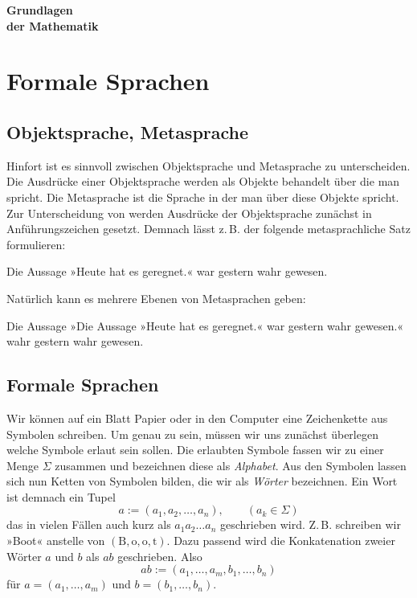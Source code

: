 \documentclass[a4paper,11pt,fleqn,twocolumn,twoside]{article}
\numberwithin{equation}{section}
\begin{document}
\thispagestyle{empty}

\begin{huge}
\noindent
\textbf{Grundlagen\\
der Mathematik}
\par
\end{huge}

\tableofcontents

\section{Formale Sprachen}
\subsection{Objektsprache, Metasprache}
Hinfort ist es sinnvoll zwischen Objektsprache und Metasprache
zu unterscheiden. Die Ausdrücke einer Objektsprache werden als
Objekte behandelt über die man spricht. Die Metasprache ist die
Sprache in der man über diese Objekte spricht. Zur Unterscheidung
von werden Ausdrücke der Objektsprache zunächst in Anführungszeichen
gesetzt. Demnach lässt z.\,B. der folgende metasprachliche
Satz formulieren:

Die Aussage »Heute hat es geregnet.« war gestern wahr gewesen.

Natürlich kann es mehrere Ebenen von Metasprachen geben:

Die Aussage »Die Aussage »Heute hat es geregnet.« war gestern wahr
gewesen.« wahr gestern wahr gewesen.

\subsection{Formale Sprachen}

Wir können auf ein Blatt Papier oder in den Computer eine Zeichenkette
aus Symbolen schreiben. Um genau zu sein, müssen wir uns zunächst
überlegen welche Symbole erlaut sein sollen. Die erlaubten Symbole
fassen wir zu einer Menge $\Sigma$ zusammen und bezeichnen diese
als \emph{Alphabet}. Aus den Symbolen lassen sich nun Ketten
von Symbolen bilden, die wir als \emph{Wörter} bezeichnen.
Ein Wort ist demnach ein Tupel
\begin{equation}
a := (a_1,a_2,\ldots,a_n), \qquad (a_k\in\Sigma)
\end{equation}
das in vielen Fällen auch kurz als $a_1a_2\ldots a_n$ geschrieben wird.
Z.\,B. schreiben wir »Boot« anstelle von
$(\text{B},\text{o},\text{o},\text{t})$. Dazu passend wird die
Konkatenation zweier Wörter $a$ und $b$ als $ab$ geschrieben.
Also
\begin{equation}
ab := (a_1,\ldots,a_m,b_1,\ldots,b_n)
\end{equation}
für $a=(a_1,\ldots,a_m)$ und $b=(b_1,\ldots,b_n)$.
\end{document}

